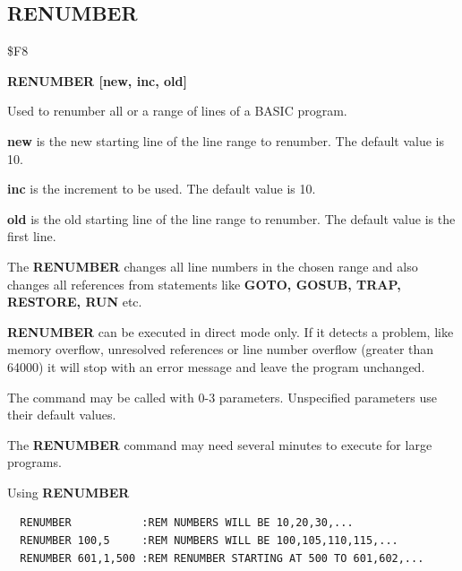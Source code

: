 
\newpage
\subsection{RENUMBER}
\begin{description}[leftmargin=2cm,style=nextline]
\item [Token:] \$F8
\item [Format:] {\bf RENUMBER [new, inc, old]}
\item [Usage:] Used to renumber all or
               a range of lines of a BASIC program.

               {\bf new } is the new starting line of the
               line range to renumber.
               The default value is 10.

               {\bf inc } is the increment to be used.
               The default value is 10.

               {\bf old } is the old starting line of the
               line range to renumber.
               The default value is the first line.

               The {\bf RENUMBER} changes all line numbers in
               the chosen range and also changes all references
               from statements like {\bf GOTO, GOSUB, TRAP,
               RESTORE, RUN} etc.

               {\bf RENUMBER} can be executed in direct mode only.
               If it detects a problem, like memory overflow,
               unresolved references or line number overflow
               (greater than 64000) it will stop with an error
               message and leave the program unchanged.

               The command may be called with 0-3 parameters.
               Unspecified parameters use their default values.

\item [Remarks:] The {\bf RENUMBER} command may need several
                 minutes to execute for large programs.

\item [Example:] Using {\bf RENUMBER}
\begin{tcolorbox}[colback=black,coltext=white]
\verbatimfont{\codefont}
\begin{verbatim}
  RENUMBER           :REM NUMBERS WILL BE 10,20,30,...
  RENUMBER 100,5     :REM NUMBERS WILL BE 100,105,110,115,...
  RENUMBER 601,1,500 :REM RENUMBER STARTING AT 500 TO 601,602,...
\end{verbatim}
\end{tcolorbox}
\end{description}

